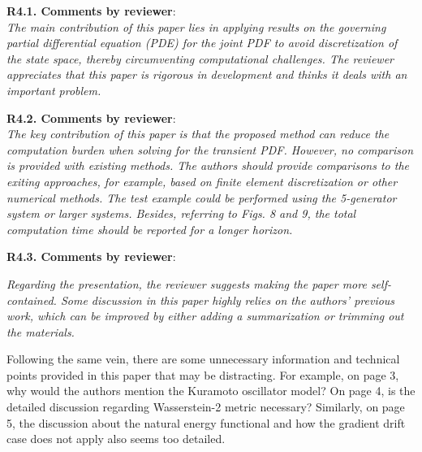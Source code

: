 \documentclass[12pt,onecolumn]{IEEEtran}
\newcommand{\blue}{\color{blue}}
\newcommand{\nib}{\noindent  {\bf Response:} }
\begin{document}
\noindent
{\bf R4.1. Comments by reviewer}:\\
{\em The main contribution of this paper lies in applying results on the governing partial differential equation (PDE) for the joint PDF to avoid discretization of the state space, thereby circumventing computational challenges. The reviewer appreciates that this paper is rigorous in development and thinks it deals with an important problem.}

{\nib \blue{We appreciate the positive remark.}}


\noindent
{\bf R4.2. Comments by reviewer}:\\
{\em The key contribution of this paper is that the proposed method can reduce the computation burden when solving for the transient PDF. However, no comparison is provided with existing methods. The authors should provide comparisons to the exiting approaches, for example, based on finite element discretization or other numerical methods. The test example could be performed using the 5-generator system or larger systems. Besides, referring to Figs. 8 and 9, the total computation time should be reported for a longer horizon.}

{\nib \blue{TBD.}}


\noindent
{\bf R4.3. Comments by reviewer}:\\
{\em Regarding the presentation, the reviewer suggests making the paper more self-contained. Some discussion in this paper highly relies on the authors' previous work, which can be improved by either adding a summarization or trimming out the materials.

Following the same vein, there are some unnecessary information and technical points provided in this paper that may be distracting.
For example, on page 3, why would the authors mention the Kuramoto oscillator model?
On page 4, is the detailed discussion regarding Wasserstein-2 metric necessary? Similarly, on page 5, the discussion about the natural energy functional and how the gradient drift case does not apply also seems too detailed.}
\end{document}
